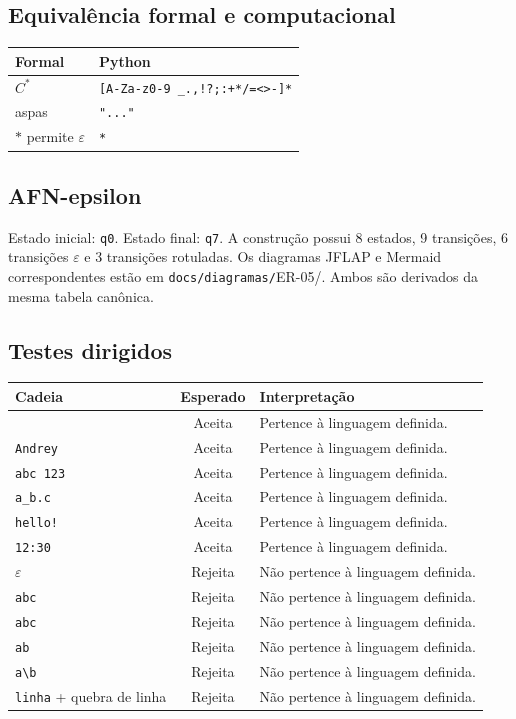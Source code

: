 \documentclass[12pt,a4paper,oneside]{report}
\begin{document}
\subsection{Equivalência formal e computacional}
\begin{center}
\small
\begin{tabular}{|p{}|p{}|}
\toprule
Formal & Python \\
\midrule
$C^*$ & \texttt{[A-Za-z0-9 \_.,!?;:+*/=<>-]*} \\
aspas & \texttt{"..."} \\
$*$ permite $\varepsilon$ & \texttt{*} \\
\bottomrule
\end{tabular}
\end{center}
\subsection{AFN-epsilon}
Estado inicial: \texttt{q0}. Estado final: \texttt{q7}. A construção possui 8 estados, 9 transições, 6 transições $\varepsilon$ e 3 transições rotuladas.
Os diagramas JFLAP e Mermaid correspondentes estão em \texttt{docs/diagramas/}ER-05/. Ambos são derivados da mesma tabela canônica.
\subsection{Testes dirigidos}
\begin{center}
\small
\begin{tabular}{|p{}|c|p{}|}
\toprule
Cadeia & Esperado & Interpretação \\
\midrule
\texttt{\textquotedbl{}\textquotedbl{}} & Aceita & Pertence à linguagem definida. \\
\texttt{\textquotedbl{}Andrey\textquotedbl{}} & Aceita & Pertence à linguagem definida. \\
\texttt{\textquotedbl{}abc 123\textquotedbl{}} & Aceita & Pertence à linguagem definida. \\
\texttt{\textquotedbl{}a\_b.c\textquotedbl{}} & Aceita & Pertence à linguagem definida. \\
\texttt{\textquotedbl{}hello!\textquotedbl{}} & Aceita & Pertence à linguagem definida. \\
\texttt{\textquotedbl{}12:30\textquotedbl{}} & Aceita & Pertence à linguagem definida. \\
$\varepsilon$ & Rejeita & Não pertence à linguagem definida. \\
\texttt{\textquotedbl{}abc} & Rejeita & Não pertence à linguagem definida. \\
\texttt{abc\textquotedbl{}} & Rejeita & Não pertence à linguagem definida. \\
\texttt{\textquotedbl{}a\textquotedbl{}b\textquotedbl{}} & Rejeita & Não pertence à linguagem definida. \\
\texttt{\textquotedbl{}a\textbackslash{}b\textquotedbl{}} & Rejeita & Não pertence à linguagem definida. \\
\texttt{\textquotedbl{}linha} + quebra de linha & Rejeita & Não pertence à linguagem definida. \\
\bottomrule
\end{tabular}
\end{center}
\end{document}
